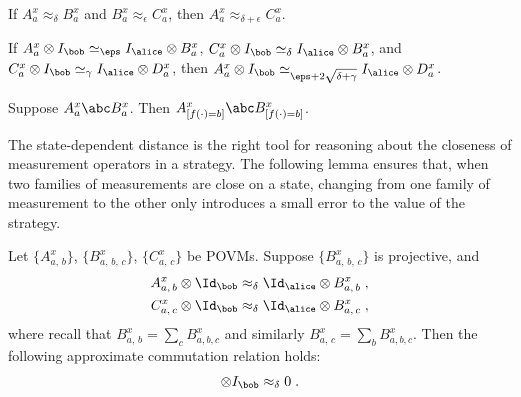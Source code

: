 \begin{fact}
  \label{fact:triangle}
  If $A_a^x \approx_\delta B_a^x$ and $B_a^x \approx_\epsilon C_a^x$, then
  $A_a^x \approx_{\delta + \epsilon} C_a^x$.
\end{fact}

\begin{fact}
 \label{fact:triangle-for-simeq}
 If $A_a^x \otimes I_\bob \simeq_\eps I_\alice \otimes B_a^x$,
 $C_a^x \otimes I_\bob \simeq_\delta I_\alice \otimes  B_a^x$,
 and $C_a^x \otimes I_\bob \simeq_\gamma I_\alice \otimes  D_a^x$,
 then $A_a^x \otimes I_\bob \simeq_{\eps + 2\sqrt{\delta + \gamma}} I_\alice \otimes  D_a^x$.
\end{fact}

\begin{fact}
  \label{fact:data-processing}
  Suppose $A^x_a \abc B^x_a$.
  Then $A^x_{[f(\cdot) = b]} \abc B^x_{[f(\cdot) = b]}$.
\end{fact}


The state-dependent distance is the right tool for reasoning about the closeness
of measurement operators in a strategy.
The following lemma ensures that, when two families of measurements are close on a
state, changing from one family of measurement to the other only introduces
a small error to the value of the strategy.

\begin{lemma}
  \label{lem:commutation-analysis}
  Let $\{A^x_{a,\, b}\}$, $\{B^x_{a,\, b,\, c}\}$, $\{C^x_{a,\, c}\}$ be POVMs.
  Suppose $\{B^x_{a,\, b,\, c}\}$ is projective, and
  \begin{align*}
    A^x_{a,\, b} \otimes \Id_\bob &\approx_\delta \Id_\alice \otimes B^x_{a,\, b}\;,\\
    C^x_{a,\, c} \otimes \Id_\bob &\approx_\delta \Id_\alice \otimes B^x_{a,\, c}\;,
  \end{align*}
	where recall that $B^x_{a,\, b} = \sum_c B^x_{a,b,c}$ and similarly $B^x_{a,\, c}=\sum_b B^x_{a,b,c}$. 
  Then the following approximate commutation relation holds:
  \begin{equation*}
    [A^x_{a,\, b}, C^x_{a,\, c}] \otimes I_\bob \approx_\delta 0\;.
  \end{equation*}
\end{lemma}

